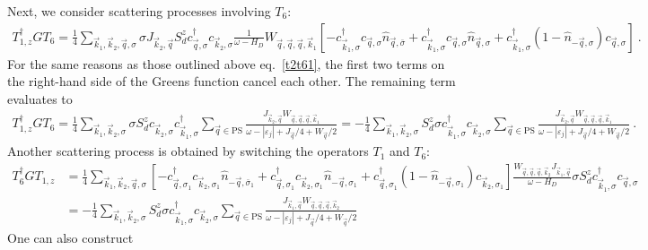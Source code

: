 \documentclass{revtex4-2}
\begin{document}
Next, we consider scattering processes involving \(T_6\):
\begin{equation}\begin{aligned}
	T_{1,z}^\dagger G T_6 = \frac{1}{4}\sum_{\vec k_1,\vec k_2,\vec q,\sigma}\sigma J_{\vec k_2,\vec q}S_d^z c^\dagger_{\vec q,\sigma} c_{\vec k_2,\sigma} \frac{1}{\omega - H_D}W_{\vec q,\vec q,\vec q,\vec k_1} \left[-c^\dagger_{\vec k_1,\sigma}c_{\vec q,\sigma}\hat n_{\vec q,\bar\sigma} + c^\dagger_{\vec k_1,\sigma}c_{\vec q,\sigma}\hat n_{\vec q,\sigma} + c^\dagger_{\vec k_1,\sigma}\left(1 - \hat n_{-\vec q,\sigma}\right) c_{\vec q,\sigma}\right]~.
\end{aligned}\end{equation}
For the same reasons as those outlined above eq.~\ref{t2t61}, the first two terms on the right-hand side of the Greens function cancel each other. The remaining term evaluates to
\begin{equation}\begin{aligned}
	T_{1,z}^\dagger G T_6 = \frac{1}{4}\sum_{\vec k_1,\vec k_2,\sigma}\sigma  S_d^z c_{\vec k_2,\sigma}c^\dagger_{\vec k_1,\sigma} \sum_{\vec q\in\text{PS}}\frac{J_{\vec k_2,\vec q} W_{\vec q,\vec q,\vec q,\vec k_1}}{\omega - |\varepsilon_j| + J_{\vec q}/4 + W_{\vec q}/2} = -\frac{1}{4}\sum_{\vec k_1,\vec k_2,\sigma} S_d^z \sigma c^\dagger_{\vec k_1,\sigma} c_{\vec k_2,\sigma} \sum_{\vec q\in\text{PS}}\frac{J_{\vec k_2,\vec q} W_{\vec q,\vec q,\vec q,\vec k_1}}{\omega - |\varepsilon_j| + J_{\vec q}/4 + W_{\vec q}/2}~.
\end{aligned}\end{equation}
Another scattering process is obtained by switching the operators \(T_1\) and \(T_6\):
\begin{equation}\begin{aligned}
	T_{6}^\dagger G T_{1,z} &= \frac{1}{4} \sum_{\vec k_1,\vec k_2,\vec q,\sigma} \left[-c^\dagger_{\vec q,\sigma_1}c_{\vec k_2,\sigma_1}\hat n_{-\vec q,\bar\sigma_1} + c^\dagger_{\vec q,\sigma_1}c_{\vec k_2,\sigma_1}\hat n_{-\vec q,\sigma_1} + c^\dagger_{\vec q,\sigma_1}\left(1 - \hat n_{-\vec q,\sigma_1}\right) c_{\vec k_2,\sigma_1}\right] \frac{W_{\vec q,\vec q,\vec q,\vec k_2} J_{\vec k_1,\vec q}}{\omega - H_D} \sigma S_d^z c^\dagger_{\vec k_1,\sigma} c_{\vec q,\sigma}\\
				&=-\frac{1}{4}\sum_{\vec k_1,\vec k_2,\sigma} S_d^z \sigma c^\dagger_{\vec k_1,\sigma} c_{\vec k_2,\sigma} \sum_{\vec q\in\text{PS}}\frac{J_{\vec k_1,\vec q} W_{\vec q,\vec q,\vec q,\vec k_2}}{\omega - |\varepsilon_j| + J_{\vec q}/4 + W_{\vec q}/2}
\end{aligned}\end{equation}
One can also construct 
\end{document}
